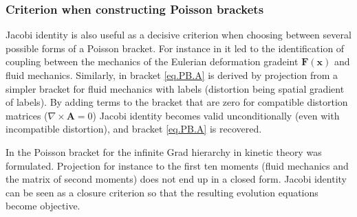 \documentclass[
10pt, %
a4paper, %
oneside, %
headinclude,footinclude, %
BCOR5mm, %
]{scrartcl}
\newcommand{\xx}{\mathbf{x}}
\newcommand{\FF}{\mathbf{F}}
\renewcommand{\AA}{\mathbf{A}}
\newcommand{\QQ}{\mathbf{Q}}
\newcommand{\MP}[1]{{\color{Green}MP:\ \ #1}}
\newcommand{\IP}[1]{{\color{Red}IP:\ \ #1}}
\newcommand{\pd}{\partial}
\begin{document}

\subsubsection{Criterion when constructing Poisson brackets}
Jacobi identity is also useful as a decisive criterion when choosing between several possible forms of a Poisson bracket. For instance in \cite{Markus2009} it led to the identification of coupling between the mechanics of the Eulerian deformation gradeint $\FF(\xx)$ and fluid mechanics. Similarly, in \cite{SHTC-GENERIC}  bracket \eqref{eq.PB.A} is derived by projection from a simpler bracket for fluid mechanics with labels (distortion being spatial gradient of labels). By adding terms to the bracket that are zero for compatible distortion matrices ($\nabla\times\AA=0$) Jacobi identity becomes valid unconditionally (even with incompatible distortion), and bracket \eqref{eq.PB.A} is recovered.

In \cite{Miroslav-Grad} the Poisson bracket for the infinite Grad hierarchy in kinetic theory was formulated. Projection for instance to the first ten moments (fluid mechanics and the matrix of second moments) does not end up in a closed form. Jacobi identity can be seen as a closure criterion so that the resulting evolution equations become objective.
\end{document}
